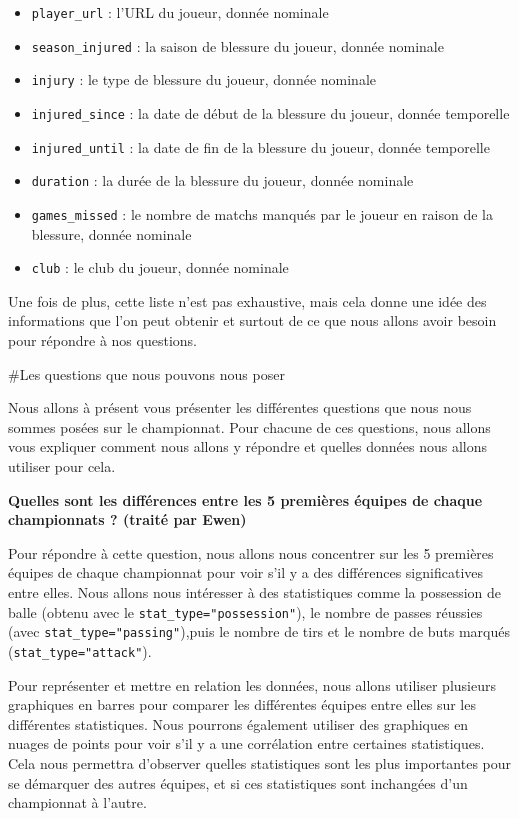 \documentclass[
]{article}
\begin{document}
\begin{itemize}
\item
  \texttt{player\_url} : l'URL du joueur, donnée nominale
\item
  \texttt{season\_injured} : la saison de blessure du joueur, donnée
  nominale
\item
  \texttt{injury} : le type de blessure du joueur, donnée nominale
\item
  \texttt{injured\_since} : la date de début de la blessure du joueur,
  donnée temporelle
\item
  \texttt{injured\_until} : la date de fin de la blessure du joueur,
  donnée temporelle
\item
  \texttt{duration} : la durée de la blessure du joueur, donnée nominale
\item
  \texttt{games\_missed} : le nombre de matchs manqués par le joueur en
  raison de la blessure, donnée nominale
\item
  \texttt{club} : le club du joueur, donnée nominale
\end{itemize}

Une fois de plus, cette liste n'est pas exhaustive, mais cela donne une
idée des informations que l'on peut obtenir et surtout de ce que nous
allons avoir besoin pour répondre à nos questions.

\#Les questions que nous pouvons nous poser

Nous allons à présent vous présenter les différentes questions que nous
nous sommes posées sur le championnat. Pour chacune de ces questions,
nous allons vous expliquer comment nous allons y répondre et quelles
données nous allons utiliser pour cela.

\textbf{Quelles sont les différences entre les 5 premières équipes de
chaque championnats ? (traité par Ewen)}

Pour répondre à cette question, nous allons nous concentrer sur les 5
premières équipes de chaque championnat pour voir s'il y a des
différences significatives entre elles. Nous allons nous intéresser à
des statistiques comme la possession de balle (obtenu avec le
\texttt{stat\_type="possession"}), le nombre de passes réussies (avec
\texttt{stat\_type="passing"}),puis le nombre de tirs et le nombre de
buts marqués (\texttt{stat\_type="attack"}).

Pour représenter et mettre en relation les données, nous allons utiliser
plusieurs graphiques en barres pour comparer les différentes équipes
entre elles sur les différentes statistiques. Nous pourrons également
utiliser des graphiques en nuages de points pour voir s'il y a une
corrélation entre certaines statistiques. Cela nous permettra d'observer
quelles statistiques sont les plus importantes pour se démarquer des
autres équipes, et si ces statistiques sont inchangées d'un championnat
à l'autre.
\end{document}
